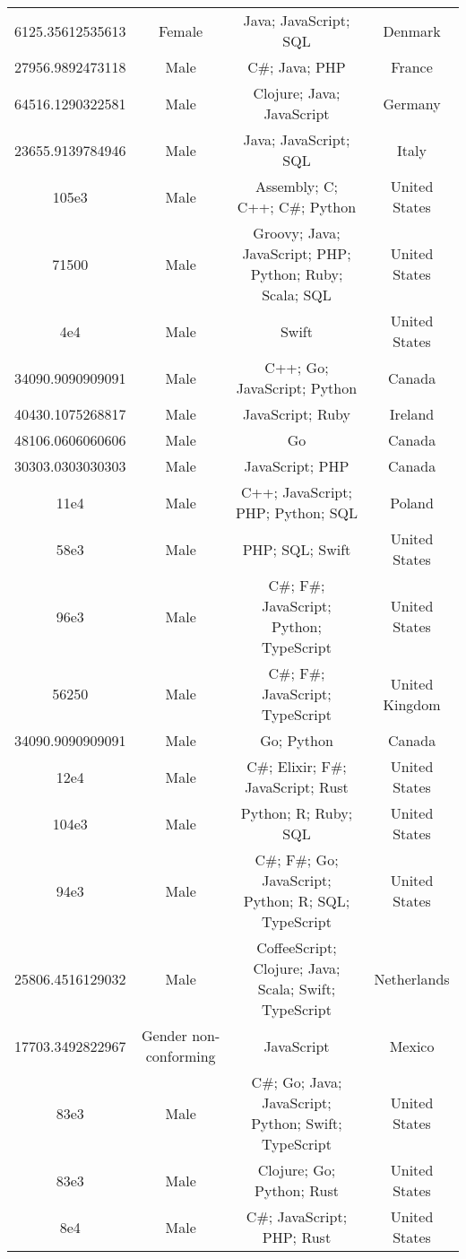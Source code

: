 \begin{center}
\begin{tabular}{ |c|c|c|c| }
6125.35612535613  &  Female  &  Java; JavaScript; SQL  &  Denmark  \\ 
27956.9892473118  &  Male  &  C\#; Java; PHP  &  France  \\ 
64516.1290322581  &  Male  &  Clojure; Java; JavaScript  &  Germany  \\ 
23655.9139784946  &  Male  &  Java; JavaScript; SQL  &  Italy  \\ 
105e3  &  Male  &  Assembly; C; C++; C\#; Python  &  United States  \\ 
71500  &  Male  &  Groovy; Java; JavaScript; PHP; Python; Ruby; Scala; SQL  &  United States  \\ 
4e4  &  Male  &  Swift  &  United States  \\ 
34090.9090909091  &  Male  &  C++; Go; JavaScript; Python  &  Canada  \\ 
40430.1075268817  &  Male  &  JavaScript; Ruby  &  Ireland  \\ 
48106.0606060606  &  Male  &  Go  &  Canada  \\ 
30303.0303030303  &  Male  &  JavaScript; PHP  &  Canada  \\ 
11e4  &  Male  &  C++; JavaScript; PHP; Python; SQL  &  Poland  \\ 
58e3  &  Male  &  PHP; SQL; Swift  &  United States  \\ 
96e3  &  Male  &  C\#; F\#; JavaScript; Python; TypeScript  &  United States  \\ 
56250  &  Male  &  C\#; F\#; JavaScript; TypeScript  &  United Kingdom  \\ 
34090.9090909091  &  Male  &  Go; Python  &  Canada  \\ 
12e4  &  Male  &  C\#; Elixir; F\#; JavaScript; Rust  &  United States  \\ 
104e3  &  Male  &  Python; R; Ruby; SQL  &  United States  \\ 
94e3  &  Male  &  C\#; F\#; Go; JavaScript; Python; R; SQL; TypeScript  &  United States  \\ 
25806.4516129032  &  Male  &  CoffeeScript; Clojure; Java; Scala; Swift; TypeScript  &  Netherlands  \\ 
17703.3492822967  &  Gender non-conforming  &  JavaScript  &  Mexico  \\ 
83e3  &  Male  &  C\#; Go; Java; JavaScript; Python; Swift; TypeScript  &  United States  \\ 
83e3  &  Male  &  Clojure; Go; Python; Rust  &  United States  \\ 
8e4  &  Male  &  C\#; JavaScript; PHP; Rust  &  United States  \\ 

\end{tabular}
\end{center}
